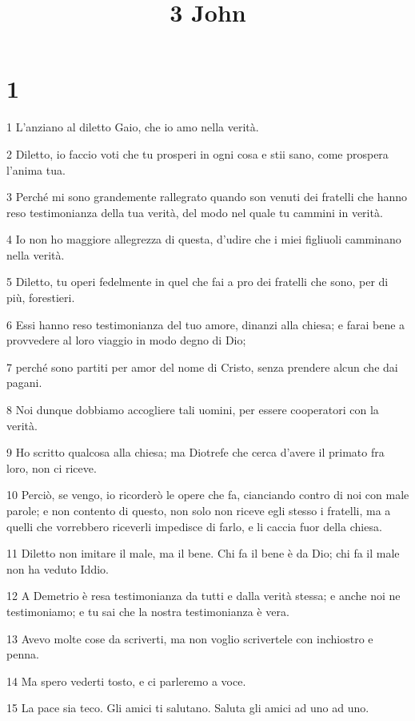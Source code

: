 

\title{3 John}


\chapter{1}

\par 1 L'anziano al diletto Gaio, che io amo nella verità.
\par 2 Diletto, io faccio voti che tu prosperi in ogni cosa e stii sano, come prospera l'anima tua.
\par 3 Perché mi sono grandemente rallegrato quando son venuti dei fratelli che hanno reso testimonianza della tua verità, del modo nel quale tu cammini in verità.
\par 4 Io non ho maggiore allegrezza di questa, d'udire che i miei figliuoli camminano nella verità.
\par 5 Diletto, tu operi fedelmente in quel che fai a pro dei fratelli che sono, per di più, forestieri.
\par 6 Essi hanno reso testimonianza del tuo amore, dinanzi alla chiesa; e farai bene a provvedere al loro viaggio in modo degno di Dio;
\par 7 perché sono partiti per amor del nome di Cristo, senza prendere alcun che dai pagani.
\par 8 Noi dunque dobbiamo accogliere tali uomini, per essere cooperatori con la verità.
\par 9 Ho scritto qualcosa alla chiesa; ma Diotrefe che cerca d'avere il primato fra loro, non ci riceve.
\par 10 Perciò, se vengo, io ricorderò le opere che fa, cianciando contro di noi con male parole; e non contento di questo, non solo non riceve egli stesso i fratelli, ma a quelli che vorrebbero riceverli impedisce di farlo, e li caccia fuor della chiesa.
\par 11 Diletto non imitare il male, ma il bene. Chi fa il bene è da Dio; chi fa il male non ha veduto Iddio.
\par 12 A Demetrio è resa testimonianza da tutti e dalla verità stessa; e anche noi ne testimoniamo; e tu sai che la nostra testimonianza è vera.
\par 13 Avevo molte cose da scriverti, ma non voglio scrivertele con inchiostro e penna.
\par 14 Ma spero vederti tosto, e ci parleremo a voce.
\par 15 La pace sia teco. Gli amici ti salutano. Saluta gli amici ad uno ad uno.


